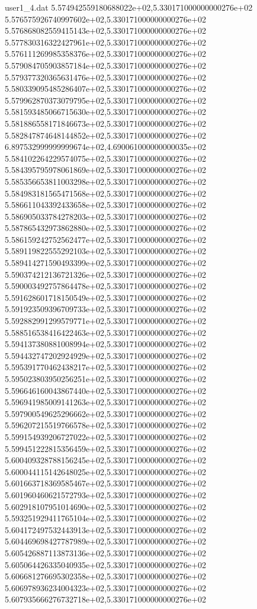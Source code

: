 \begin{filecontents}{user1_4.dat}
5.574942559180688022e+02,5.330171000000000276e+02
5.576575926740997602e+02,5.330171000000000276e+02
5.576868082559415143e+02,5.330171000000000276e+02
5.577830316322427961e+02,5.330171000000000276e+02
5.576111269985358376e+02,5.330171000000000276e+02
5.579084705903857184e+02,5.330171000000000276e+02
5.579377320365631476e+02,5.330171000000000276e+02
5.580339095485286407e+02,5.330171000000000276e+02
5.579962870373079795e+02,5.330171000000000276e+02
5.581593485066715630e+02,5.330171000000000276e+02
5.581886558171846673e+02,5.330171000000000276e+02
5.582847874648144852e+02,5.330171000000000276e+02
6.897532999999999674e+02,4.690061000000000035e+02
5.584102264229574075e+02,5.330171000000000276e+02
5.584395795978061869e+02,5.330171000000000276e+02
5.585356653811003298e+02,5.330171000000000276e+02
5.584983181565471568e+02,5.330171000000000276e+02
5.586611043392433658e+02,5.330171000000000276e+02
5.586905033784278203e+02,5.330171000000000276e+02
5.587865432973862880e+02,5.330171000000000276e+02
5.586159242752562477e+02,5.330171000000000276e+02
5.589119822555292103e+02,5.330171000000000276e+02
5.589414271590493399e+02,5.330171000000000276e+02
5.590374212136721326e+02,5.330171000000000276e+02
5.590003492757864478e+02,5.330171000000000276e+02
5.591628601718150549e+02,5.330171000000000276e+02
5.591923509396709733e+02,5.330171000000000276e+02
5.592882991299579771e+02,5.330171000000000276e+02
5.588516538416422463e+02,5.330171000000000276e+02
5.594137380881008994e+02,5.330171000000000276e+02
5.594432747202924929e+02,5.330171000000000276e+02
5.595391770462438217e+02,5.330171000000000276e+02
5.595023803950256251e+02,5.330171000000000276e+02
5.596646160043867440e+02,5.330171000000000276e+02
5.596941985009141263e+02,5.330171000000000276e+02
5.597900549625296662e+02,5.330171000000000276e+02
5.596207215519766578e+02,5.330171000000000276e+02
5.599154939206727022e+02,5.330171000000000276e+02
5.599451222815356459e+02,5.330171000000000276e+02
5.600409328788156245e+02,5.330171000000000276e+02
5.600044115142648025e+02,5.330171000000000276e+02
5.601663718369585467e+02,5.330171000000000276e+02
5.601960460621572793e+02,5.330171000000000276e+02
5.602918107951014690e+02,5.330171000000000276e+02
5.593251929411765104e+02,5.330171000000000276e+02
5.604172497532443913e+02,5.330171000000000276e+02
5.604469698427787989e+02,5.330171000000000276e+02
5.605426887113873136e+02,5.330171000000000276e+02
5.605064426335040935e+02,5.330171000000000276e+02
5.606681276695302358e+02,5.330171000000000276e+02
5.606978936234004323e+02,5.330171000000000276e+02
5.607935666276732718e+02,5.330171000000000276e+02

\end{filecontents}
